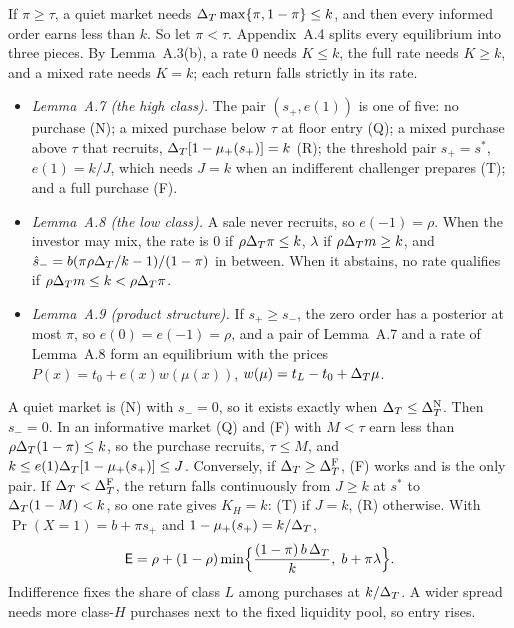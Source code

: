 If \(\pi\ge\tau\), a quiet market needs \(\Delta_T\max\{\pi,1-\pi\}\le k\), and then every informed order earns less than
\(k\). So let \(\pi<\tau\). Appendix~A.4 splits every equilibrium into three pieces. By Lemma~A.3(b), a rate \(0\)
needs \(K\le k\), the full rate needs \(K\ge k\), and a mixed rate needs \(K=k\); each return falls strictly in its
rate.
\begin{itemize}
\item \emph{Lemma~A.7 (the high class).} The pair \((s_+,e(1))\) is one of five: no purchase (N); a mixed purchase
  below \(\tau\) at floor entry (Q); a mixed purchase above \(\tau\) that recruits, \(\Delta_T[1-\mu_+(s_+)]=k\) (R); the
  threshold pair \(s_+=s^*\), \(e(1)=k/J\), which needs \(J=k\) when an indifferent challenger prepares (T); and a full
  purchase (F).
\item \emph{Lemma~A.8 (the low class).} A sale never recruits, so \(e(-1)=\rho\). When the investor may mix, the rate
  is \(0\) if \(\rho\Delta_T\pi\le k\), \(\lambda\) if \(\rho\Delta_T m\ge k\), and \(\hat s_-=b(\pi\rho\Delta_T/k-1)/(1-\pi)\) in
  between. When it abstains, no rate qualifies if \(\rho\Delta_T m\le k<\rho\Delta_T\pi\).
\item \emph{Lemma~A.9 (product structure).} If \(s_+\ge s_-\), the zero order has a posterior at most \(\pi\), so
  \(e(0)=e(-1)=\rho\), and a pair of Lemma~A.7 and a rate of Lemma~A.8 form an equilibrium with the prices
  \(P(x)=t_0+e(x)w(\mu(x))\), \(w(\mu)=t_L-t_0+\Delta_T\mu\).
\end{itemize}
A quiet market is (N) with \(s_-=0\), so it exists exactly when \(\Delta_T\le\Delta_T^{\rm N}\). Then \(s_-=0\). In an
informative market (Q) and (F) with \(M<\tau\) earn less than \(\rho\Delta_T(1-\pi)\le k\), so the purchase recruits,
\(\tau\le M\), and \(k\le e(1)\Delta_T[1-\mu_+(s_+)]\le J\). Conversely, if \(\Delta_T\ge\Delta_T^{\rm F}\), (F) works and is the only
pair. If \(\Delta_T<\Delta_T^{\rm F}\), the return falls continuously from \(J\ge k\) at \(s^*\) to \(\Delta_T(1-M)<k\), so one rate
gives \(K_H=k\): (T) if \(J=k\), (R) otherwise. With \(\Pr(X=1)=b+\pi s_+\) and \(1-\mu_+(s_+)=k/\Delta_T\),
\begin{equation}\label{eq:coexistence-entry}
\mathsf{E}=\rho+(1-\rho)\min\Bigl\{\frac{(1-\pi)\,b\,\Delta_T}{k},\;b+\pi\lambda\Bigr\}.
\end{equation}
Indifference fixes the share of class \(L\) among purchases at \(k/\Delta_T\). A wider spread needs more class-\(H\)
purchases next to the fixed liquidity pool, so entry rises.

